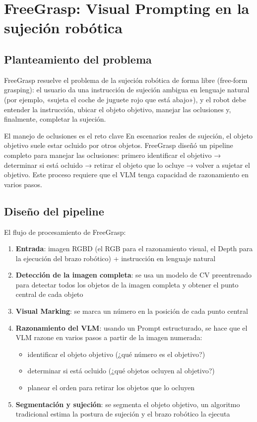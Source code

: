 \section{FreeGrasp: Visual Prompting en la sujeción robótica}

\subsection{Planteamiento del problema}

FreeGrasp resuelve el problema de la sujeción robótica de forma libre (free-form grasping): el usuario da una instrucción de sujeción ambigua en lenguaje natural (por ejemplo, «sujeta el coche de juguete rojo que está abajo»), y el robot debe entender la instrucción, ubicar el objeto objetivo, manejar las oclusiones y, finalmente, completar la sujeción.

\begin{knowledgebox}{El manejo de oclusiones es el reto clave}
En escenarios reales de sujeción, el objeto objetivo suele estar ocluido por otros objetos. FreeGrasp diseñó un pipeline completo para manejar las oclusiones: primero identificar el objetivo → determinar si está ocluido → retirar el objeto que lo ocluye → volver a sujetar el objetivo. Este proceso requiere que el VLM tenga capacidad de razonamiento en varios pasos.
\end{knowledgebox}

\subsection{Diseño del pipeline}

El flujo de procesamiento de FreeGrasp:

\begin{enumerate}
    \item \textbf{Entrada}: imagen RGBD (el RGB para el razonamiento visual, el Depth para la ejecución del brazo robótico) + instrucción en lenguaje natural
    \item \textbf{Detección de la imagen completa}: se usa un modelo de CV preentrenado para detectar todos los objetos de la imagen completa y obtener el punto central de cada objeto
    \item \textbf{Visual Marking}: se marca un número en la posición de cada punto central
    \item \textbf{Razonamiento del VLM}: usando un Prompt estructurado, se hace que el VLM razone en varios pasos a partir de la imagen numerada:
    \begin{itemize}
        \item identificar el objeto objetivo (¿qué número es el objetivo?)
        \item determinar si está ocluido (¿qué objetos ocluyen al objetivo?)
        \item planear el orden para retirar los objetos que lo ocluyen
    \end{itemize}
    \item \textbf{Segmentación y sujeción}: se segmenta el objeto objetivo, un algoritmo tradicional estima la postura de sujeción y el brazo robótico la ejecuta
\end{enumerate}

